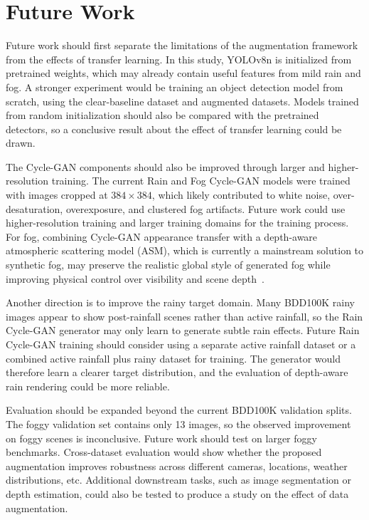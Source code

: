 \documentclass[10pt,letterpaper]{article}
\begin{document}
\section{Future Work}

Future work should first separate the limitations of the augmentation framework from the effects of transfer learning. In this study, YOLOv8n is initialized from pretrained weights,
which may already contain useful features from mild rain and fog. A stronger experiment would be training an object detection model from scratch, using the clear-baseline dataset and augmented datasets. 
Models trained from random initialization should also be compared with the pretrained detectors, so a conclusive result about the effect of transfer learning could be drawn. 

The Cycle-GAN components should also be improved through larger and higher-resolution training. The current Rain and Fog Cycle-GAN models were trained with images cropped at $384\times384$, 
which likely contributed to white noise, over-desaturation, overexposure, and clustered fog artifacts. Future work could use higher-resolution training and larger training domains for the training process. 
For fog, combining Cycle-GAN appearance transfer with a depth-aware atmospheric scattering model (ASM), which is currently a mainstream solution to synthetic fog, may preserve the realistic global style of generated fog while improving physical control over visibility and scene depth~\cite{sakaridisSemanticFoggyScene2018,cordtsCityscapesDatasetSemantic2016}.

Another direction is to improve the rainy target domain. Many BDD100K rainy images appear to show post-rainfall scenes rather than active rainfall, so the Rain Cycle-GAN generator may only learn to generate subtle rain effects.
Future Rain Cycle-GAN training should consider using a separate active rainfall dataset or a combined active rainfall plus rainy dataset for training. 
The generator would therefore learn a clearer target distribution, and the evaluation of depth-aware rain rendering could be more reliable.

Evaluation should be expanded beyond the current BDD100K validation splits. The foggy validation set contains only 13 images, so the observed improvement on foggy scenes is inconclusive.
Future work should test on larger foggy benchmarks. Cross-dataset evaluation would show whether the proposed augmentation improves robustness across different cameras, locations, weather distributions, etc.
Additional downstream tasks, such as image segmentation or depth estimation, could also be tested to produce a study on the effect of data augmentation.
\end{document}
